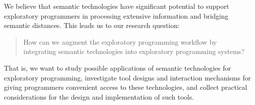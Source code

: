 We believe that semantic technologies have significant potential to support exploratory programmers in processing extensive information and bridging semantic distances.
%
%
%
This leads us to our research question:
%
\begin{quote}
	How can we augment the exploratory programming workflow by integrating semantic technologies into exploratory programming systems?
\end{quote}

That is, we want to study possible applications of semantic technologies for exploratory programming, investigate tool designs and interaction mechanisms for giving programmers convenient access to these technologies, and collect practical considerations for the design and implementation of such tools.

